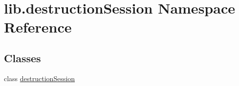 \hypertarget{namespacelib_1_1destruction_session}{\section{lib.\-destruction\-Session Namespace Reference}
\label{namespacelib_1_1destruction_session}
}
\subsection*{Classes}
\begin{DoxyCompactItemize}
\item 
class \hyperlink{classlib_1_1destruction_session_1_1destruction_session}{destruction\-Session}
\end{DoxyCompactItemize}
